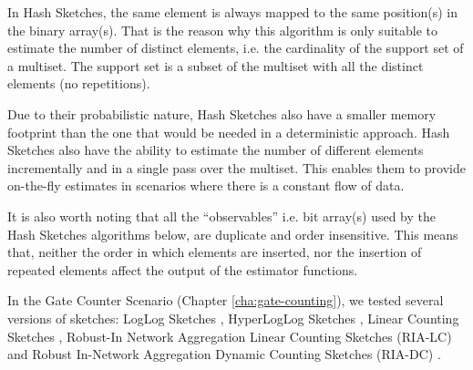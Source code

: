 In Hash Sketches, the same element is always mapped to the same
position(s) in the binary array(s). That is the reason why this
algorithm is only suitable to estimate the number of distinct
elements, i.e. the cardinality of the support set of a multiset. The
support set is a subset of the multiset with all the distinct elements (no
repetitions).

Due to their probabilistic nature, Hash Sketches also have a smaller
memory footprint than the one that would be needed in a deterministic
approach. Hash Sketches also have the ability to estimate the number
of different elements incrementally and in a single pass over the
multiset. This enables them to provide on-the-fly estimates in
scenarios where there is a constant flow of data.

It is also worth noting that all the ``observables'' i.e. bit
array(s) used by the Hash Sketches algorithms below, are
duplicate and order insensitive. This means that, neither the order in
which elements are inserted, nor the insertion of repeated elements
affect the output of the estimator functions.

In the Gate Counter Scenario (Chapter \ref{cha:gate-counting}), we
tested several versions of sketches: LogLog Sketches
\cite{Durand:2003tc}, HyperLogLog Sketches \cite{Fusy:2007um}, Linear
Counting Sketches \cite{Whang:1990uh}, Robust-In Network Aggregation
Linear Counting Sketches (RIA-LC)
\cite{Fan:2008wl,YaoChungFanArbeeLPChen:2010to} and Robust In-Network
Aggregation Dynamic Counting Sketches (RIA-DC)
\cite{YaoChungFanArbeeLPChen:2010to}.

